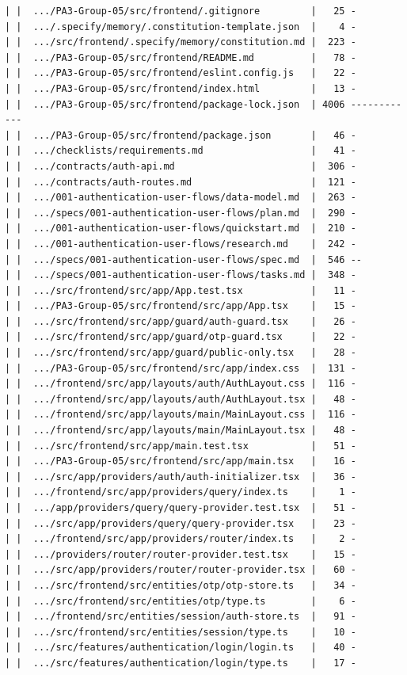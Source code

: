 \documentclass[12pt]{article}
\begin{document}
\begin{lstlisting}[numbers=none,breaklines=true]
| |  .../PA3-Group-05/src/frontend/.gitignore         |   25 -
| |  .../.specify/memory/.constitution-template.json  |    4 -
| |  .../src/frontend/.specify/memory/constitution.md |  223 -
| |  .../PA3-Group-05/src/frontend/README.md          |   78 -
| |  .../PA3-Group-05/src/frontend/eslint.config.js   |   22 -
| |  .../PA3-Group-05/src/frontend/index.html         |   13 -
| |  .../PA3-Group-05/src/frontend/package-lock.json  | 4006 ------------
| |  .../PA3-Group-05/src/frontend/package.json       |   46 -
| |  .../checklists/requirements.md                   |   41 -
| |  .../contracts/auth-api.md                        |  306 -
| |  .../contracts/auth-routes.md                     |  121 -
| |  .../001-authentication-user-flows/data-model.md  |  263 -
| |  .../specs/001-authentication-user-flows/plan.md  |  290 -
| |  .../001-authentication-user-flows/quickstart.md  |  210 -
| |  .../001-authentication-user-flows/research.md    |  242 -
| |  .../specs/001-authentication-user-flows/spec.md  |  546 --
| |  .../specs/001-authentication-user-flows/tasks.md |  348 -
| |  .../src/frontend/src/app/App.test.tsx            |   11 -
| |  .../PA3-Group-05/src/frontend/src/app/App.tsx    |   15 -
| |  .../src/frontend/src/app/guard/auth-guard.tsx    |   26 -
| |  .../src/frontend/src/app/guard/otp-guard.tsx     |   22 -
| |  .../src/frontend/src/app/guard/public-only.tsx   |   28 -
| |  .../PA3-Group-05/src/frontend/src/app/index.css  |  131 -
| |  .../frontend/src/app/layouts/auth/AuthLayout.css |  116 -
| |  .../frontend/src/app/layouts/auth/AuthLayout.tsx |   48 -
| |  .../frontend/src/app/layouts/main/MainLayout.css |  116 -
| |  .../frontend/src/app/layouts/main/MainLayout.tsx |   48 -
| |  .../src/frontend/src/app/main.test.tsx           |   51 -
| |  .../PA3-Group-05/src/frontend/src/app/main.tsx   |   16 -
| |  .../src/app/providers/auth/auth-initializer.tsx  |   36 -
| |  .../frontend/src/app/providers/query/index.ts    |    1 -
| |  .../app/providers/query/query-provider.test.tsx  |   51 -
| |  .../src/app/providers/query/query-provider.tsx   |   23 -
| |  .../frontend/src/app/providers/router/index.ts   |    2 -
| |  .../providers/router/router-provider.test.tsx    |   15 -
| |  .../src/app/providers/router/router-provider.tsx |   60 -
| |  .../src/frontend/src/entities/otp/otp-store.ts   |   34 -
| |  .../src/frontend/src/entities/otp/type.ts        |    6 -
| |  .../frontend/src/entities/session/auth-store.ts  |   91 -
| |  .../src/frontend/src/entities/session/type.ts    |   10 -
| |  .../src/features/authentication/login/login.ts   |   40 -
| |  .../src/features/authentication/login/type.ts    |   17 -

\end{lstlisting}
\end{document}
